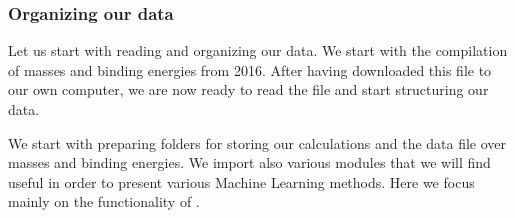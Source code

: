\documentclass[letterpaper,10pt,english]{sphinxmanual}
\begin{document}
\subsubsection{Organizing our data}
\label{\detokenize{chapter2:organizing-our-data}}
Let us start with reading and organizing our data.
We start with the compilation of masses and binding energies from 2016.
After having downloaded this file to our own computer, we are now ready to read the file and start structuring our data.

We start with preparing folders for storing our calculations and the data file over masses and binding energies. We import also various modules that we will find useful in order to present various Machine Learning methods. Here we focus mainly on the functionality of .
\end{document}
